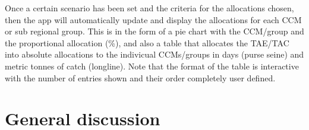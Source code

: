 \documentclass[11pt]{article}
\begin{document}
Once a certain scenario has been set and the criteria for the allocations chosen, then the app will automatically update and display the allocations for each CCM or sub regional group. This is in the form of a pie chart with the CCM/group and the proportional allocation (\%), and also a table that allocates the TAE/TAC into absolute allocations to the indivicual CCMs/groups in days (purse seine) and metric tonnes of catch (longline). Note that the format of the table is interactive with the number of entries shown and their order completely user defined.





\section{General discussion}





\newpage

%
\end{document}
